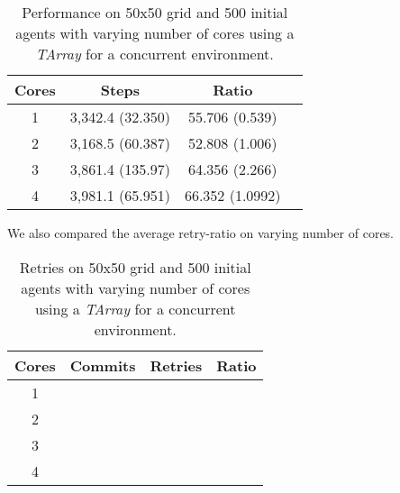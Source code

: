 \begin{table}
	\centering
  	\begin{tabular}{ c || c | c | c }
        Cores & Steps            & Ratio          \\ \hline \hline 
    	1     & 3,342.4 (32.350) & 55.706 (0.539) \\ \hline
   		2     & 3,168.5 (60.387) & 52.808 (1.006) \\ \hline
   		3     & 3,861.4 (135.97) & 64.356 (2.266) \\ \hline
   		4     & 3,981.1 (65.951) & 66.352 (1.0992) \\ \hline \hline
   	\end{tabular}
  	
  	\caption{Performance on 50x50 grid and 500 initial agents with varying number of cores using a \textit{TArray} for a concurrent environment.}
	\label{tab:tarray_results_concenv_time}
\end{table}

We also compared the average retry-ratio on varying number of cores.

\begin{table}
	\centering
  	\begin{tabular}{ c || c | c | c }
        Cores & Commits           & Retries            & Ratio \\ \hline \hline 
    	1     &                   &                    &  \\ \hline
   		2     &                   &                    &  \\ \hline
   		3     &                   &                    &  \\ \hline
   		4     &                   &                    &  \\ \hline
   	\end{tabular}
  	
  	\caption{Retries on 50x50 grid and 500 initial agents with varying number of cores using a \textit{TArray} for a concurrent environment.}
	\label{tab:tarray_naive_results_concenv_retries}
\end{table}

